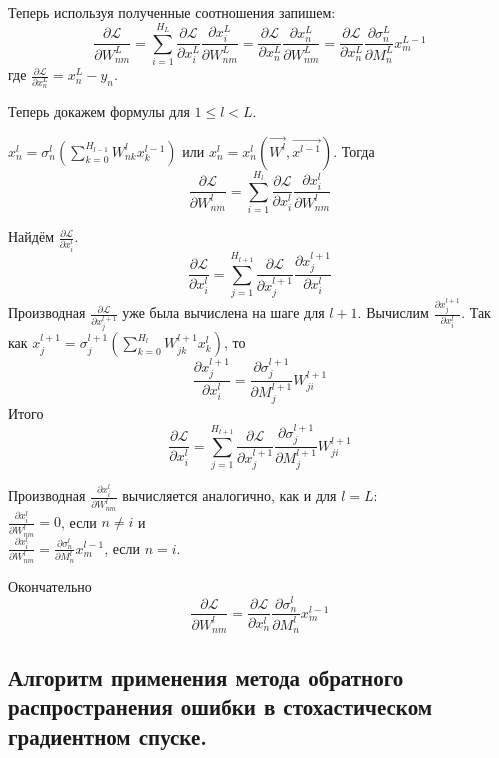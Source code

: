 Теперь используя полученные соотношения запишем:
$$
	\frac{\partial \mathcal{L}}{\partial {W^{L}_{nm}}} = \sum\limits_{i = 1}^{H_L} \frac{\partial \mathcal{L}}{\partial x^L_i} \frac{\partial x^L_i}{\partial W^L_{nm}} = \frac{\partial \mathcal{L}}{\partial x^L_n} \frac{\partial x^L_n}{\partial W^L_{nm}} = \frac{\partial \mathcal{L}}{\partial x^L_n} \frac{\partial \sigma^L_n}{\partial M^L_n} x^{L-1}_m
$$
где $\frac{\partial \mathcal{L}}{\partial x^L_n} = x^L_n - y_n$.

Теперь докажем формулы для $1 \le l < L$.

$x^l_n = \sigma^l_n\left(\sum\limits_{k = 0}^{H_{l-1}} W^{l}_{nk} x^{l-1}_k\right)$ или $x^l_n = x^l_n (\overrightarrow{W^l}, \overrightarrow{x^{l-1}})$. Тогда
$$
	\frac{\partial \mathcal{L}}{\partial W^l_{nm}} = \sum_{i = 1}^{H_l} \frac{\partial \mathcal{L}}{\partial x^l_i} \frac{\partial x^l_i}{\partial W^{l}_{nm}}
$$

Найдём $\frac{\partial \mathcal{L}}{\partial x^l_i}$.
$$
	\frac{\partial \mathcal{L}}{\partial x^l_i} = \sum\limits_{j = 1}^{H_{l+1}} \frac{\partial \mathcal{L}}{\partial x^{l+1}_j} \frac{\partial x^{l+1}_j}{\partial x^{l}_i}
$$
Производная $\frac{\partial \mathcal{L}}{\partial x^{l+1}_j}$ уже была вычислена на шаге для $l+1$. Вычислим $\frac{\partial x^{l+1}_j}{\partial x^{l}_i}$. Так как $x^{l+1}_j = \sigma^{l+1}_j\left(\sum\limits_{k = 0}^{H_{l}} W^{l+1}_{jk} x^{l}_k\right)$, то
$$
	\frac{\partial x^{l+1}_j}{\partial x^{l}_i} = \frac{\partial \sigma^{l+1}_{j}}{\partial M^{l+1}_j} W^{l+1}_{ji}
$$
Итого
$$
	\frac{\partial \mathcal{L}}{\partial x^l_i} = \sum\limits_{j = 1}^{H_{l+1}} \frac{\partial \mathcal{L}}{\partial x^{l+1}_j} \frac{\partial \sigma^{l+1}_{j}}{\partial M^{l+1}_j} W^{l+1}_{ji}
$$

Производная $\frac{\partial x^l_i}{\partial W^{l}_{nm}}$ вычисляется аналогично, как и для $l = L$: \\
$\frac{\partial x^l_i}{\partial W^l_{nm}} = 0$, если $n \neq i$ и \\
$\frac{\partial x^l_i}{\partial W^l_{nm}} = \frac{\partial \sigma^l_n}{\partial M^l_n} x^{l-1}_m$, если $n = i$.

Окончательно
$$
	\frac{\partial \mathcal{L}}{\partial W^l_{nm}} = \frac{\partial \mathcal{L}}{\partial x^l_n} \frac{\partial \sigma^l_n}{\partial M^l_n} x^{l-1}_m
$$

\subsection{Алгоритм применения метода обратного распространения ошибки в стохастическом градиентном спуске.}

